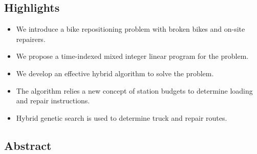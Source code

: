 \documentclass[
  english,
]{article}
\author{}
\date{}
\begin{document}
\begin{otherlanguage}{english}

\protect{}\label{abstracts}
\protect{}\label{ab005}
\begin{otherlanguage}{english}

\subsection{Highlights}\label{highlights}

\protect{}\label{as005}
\protect{}\label{sp0005}
\begin{itemize}
\item
  \protect{}\label{p0005}
  We introduce a bike repositioning problem with broken bikes and on-site repairers.
\item
  \protect{}\label{p0010}
  We propose a time-indexed mixed integer linear program for the problem.
\item
  \protect{}\label{p0015}
  We develop an effective hybrid algorithm to solve the problem.
\item
  \protect{}\label{p0020}
  The algorithm relies a new concept of station budgets to determine loading and repair
  instructions.
\item
  \protect{}\label{p0025}
  Hybrid genetic search is used to determine truck and repair routes.
\end{itemize}

\end{otherlanguage}

\protect{}\label{ab010}
\subsection{Abstract}\label{abstract}


\end{otherlanguage}
\end{document}
